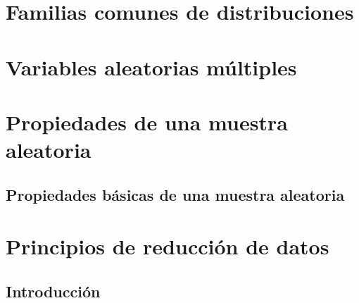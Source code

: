 \documentclass[14pt]{extarticle}
\begin{document}
\section{Familias comunes de distribuciones}


\section{Variables aleatorias múltiples}

\section{Propiedades de una muestra aleatoria}
\subsection{Propiedades básicas de una muestra aleatoria}
\section{Principios de reducción de datos}

\subsection{Introducción}
\end{document}
